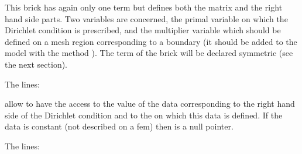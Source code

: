 \documentclass[a4paper,11pt,english]{sphinxmanual}
\begin{document}
\begin{sphinxVerbatim}[commandchars=\\\{\}]
     
                                     
                                     
                                     
                                     
\end{sphinxVerbatim}

This brick has again only one term but defines both the matrix and the right hand
side parts. Two variables are concerned, the primal variable on which the
Dirichlet condition is prescribed, and the multiplier variable which should be
defined on a mesh region corresponding to a boundary (it should be added to the
model with the method ). The term of the brick will be declared
symmetric (see the next section).

The lines:

\begin{sphinxVerbatim}[commandchars=\\\{\}]
    \PYG{p}{[}\PYG{p}{]}
    \PYG{p}{[}\PYG{p}{]}
\end{sphinxVerbatim}

allow to have the access to the value of the data corresponding to the right hand
side of the Dirichlet condition and to the  on which this data is defined. If
the data is constant (not described on a fem) then  is a null pointer.

The lines:
\end{document}
